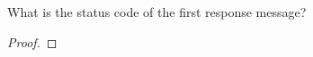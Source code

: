 \documentclass[../../main.tex]{subfiles}
\begin{document}
\begin{wts}
What is the status code of the first response message?
\end{wts}
\begin{proof}

\end{proof}
\end{document}
